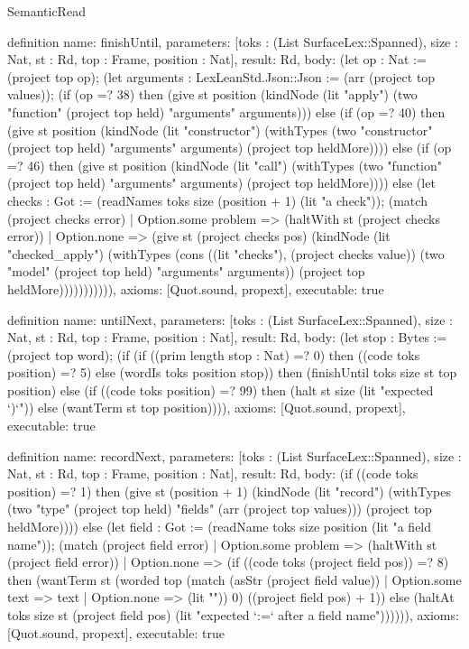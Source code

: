 \begin{lexlean}{SemanticRead}
\begin{semanticmodule}
definition{
  name: finishUntil,
  parameters: [toks : (List SurfaceLex::Spanned), size : Nat, st : Rd, top : Frame, position : Nat],
  result: Rd,
  body: (let op : Nat := (project top op); (let arguments : LexLeanStd.Json::Json := (arr (project top values)); (if (op =? 38) then (give st position (kindNode (lit "apply") (two "function" (project top held) "arguments" arguments))) else (if (op =? 40) then (give st position (kindNode (lit "constructor") (withTypes (two "constructor" (project top held) "arguments" arguments) (project top heldMore)))) else (if (op =? 46) then (give st position (kindNode (lit "call") (withTypes (two "function" (project top held) "arguments" arguments) (project top heldMore)))) else (let checks : Got := (readNames toks size (position + 1) (lit "a check")); (match (project checks error)
    | Option.some problem => (haltWith st (project checks error))
    | Option.none => (give st (project checks pos) (kindNode (lit "checked_apply") (withTypes (cons ((lit "checks"), (project checks value)) (two "model" (project top held) "arguments" arguments)) (project top heldMore))))))))))),
  axioms: [Quot.sound, propext],
  executable: true
}

definition{
  name: untilNext,
  parameters: [toks : (List SurfaceLex::Spanned), size : Nat, st : Rd, top : Frame, position : Nat],
  result: Rd,
  body: (let stop : Bytes := (project top word); (if (if ((prim length stop : Nat) =? 0) then ((code toks position) =? 5) else (wordIs toks position stop)) then (finishUntil toks size st top position) else (if ((code toks position) =? 99) then (halt st size (lit "expected `)`")) else (wantTerm st top position)))),
  axioms: [Quot.sound, propext],
  executable: true
}

definition{
  name: recordNext,
  parameters: [toks : (List SurfaceLex::Spanned), size : Nat, st : Rd, top : Frame, position : Nat],
  result: Rd,
  body: (if ((code toks position) =? 1) then (give st (position + 1) (kindNode (lit "record") (withTypes (two "type" (project top held) "fields" (arr (project top values))) (project top heldMore)))) else (let field : Got := (readName toks size position (lit "a field name")); (match (project field error)
    | Option.some problem => (haltWith st (project field error))
    | Option.none => (if ((code toks (project field pos)) =? 8) then (wantTerm st (worded top (match (asStr (project field value))
      | Option.some text => text
      | Option.none => (lit "")) 0) ((project field pos) + 1)) else (haltAt toks size st (project field pos) (lit "expected `:=` after a field name")))))),
  axioms: [Quot.sound, propext],
  executable: true
}


\end{semanticmodule}
\end{lexlean}
